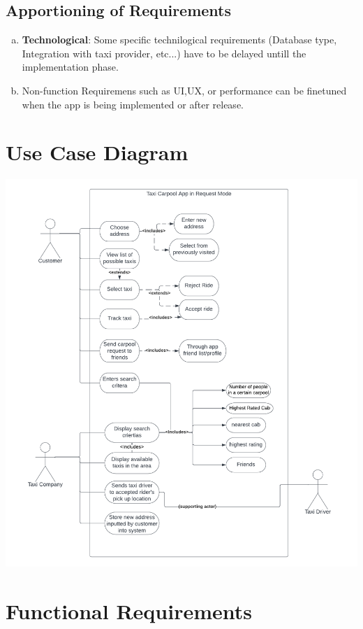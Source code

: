 \documentclass[]{article}
\begin{document}
\subsection{Apportioning of Requirements}
\label{sub:apportioning_of_requirements}

\begin{enumerate}[a)]
	\item \textbf{Technological}: Some specific technilogical requirements (Database type, Integration with taxi provider, etc...) have to be delayed untill the implementation phase.
	\item Non-function Requiremens such as UI,UX, or performance can be finetuned when the app is being implemented or after release.
\end{enumerate}


\section{Use Case Diagram}
\label{sec:use_case_diagram}
\includegraphics[scale = 0.8]{Use_Case_Diagram.png}

\newpage
\section{Functional Requirements}
\label{sec:functional_requirements}
\end{document}

